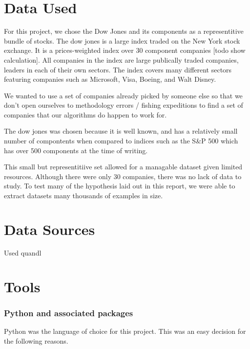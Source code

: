 \documentclass{report}
\begin{document}
\section{Data Used}

For this project, we chose the Dow Jones and its components as a representitive bundle of stocks. The dow jones is a large index traded on the New York stock exchange. It is a prices-weighted index over 30 component companies [todo show calculation]. All companies in the index are large publically traded companies, leaders in each of their own sectors. The index covers many different sectors featuring companies such as Microsoft, Visa, Boeing, and Walt Disney.

We wanted to use a set of companies already picked by someone else so that we don't open ourselves to methodology errors / fishing expeditions to find a set of companies that our algorithms do happen to work for. 

The dow jones was chosen because it is well known, and has a relatively small number of compontents when compared to indices such as the S\&P 500 which has over 500 components at the time of writing. 

This small but representitiive set allowed for a managable dataset given limited resources. Although there were only 30 companies, there was no lack of data to study. To test many of the hypothesis laid out in this report, we were able to extract datasets many thousands of examples in size.

\section{Data Sources}

Used quandl

\section{Tools}
\subsubsection{Python and associated packages}

Python was the language of choice for this project. This was an easy decision for the following reasons.
\end{document}
